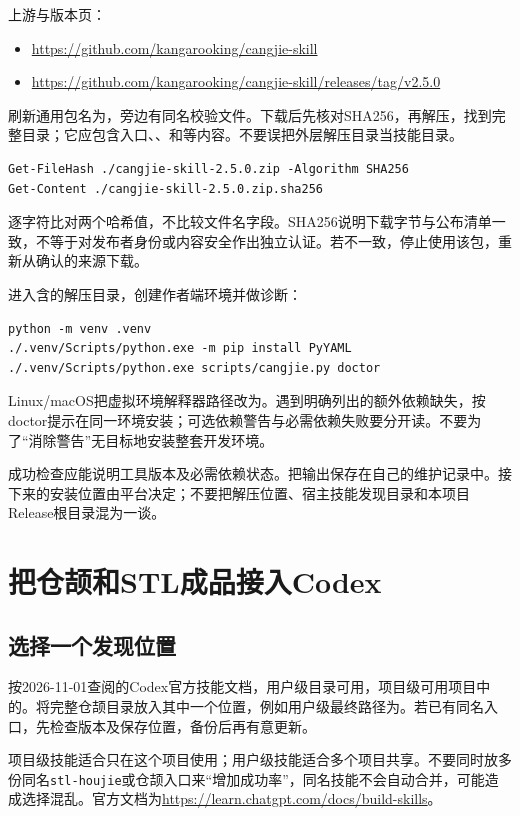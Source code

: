 \documentclass[11pt,a4paper,fontset=fandol]{ctexart}
\begin{document}
\noindent 上游与版本页：
\begin{itemize}
\item \url{https://github.com/kangarooking/cangjie-skill}
\item \url{https://github.com/kangarooking/cangjie-skill/releases/tag/v2.5.0}
\end{itemize}
刷新通用包名为，旁边有同名校验文件。下载后先核对SHA256，再解压，找到完整目录；它应包含入口、、和等内容。不要误把外层解压目录当技能目录。

\begin{lstlisting}
Get-FileHash ./cangjie-skill-2.5.0.zip -Algorithm SHA256
Get-Content ./cangjie-skill-2.5.0.zip.sha256
\end{lstlisting}
逐字符比对两个哈希值，不比较文件名字段。SHA256说明下载字节与公布清单一致，不等于对发布者身份或内容安全作出独立认证。若不一致，停止使用该包，重新从确认的来源下载。

进入含的解压目录，创建作者端环境并做诊断：
\begin{lstlisting}
python -m venv .venv
./.venv/Scripts/python.exe -m pip install PyYAML
./.venv/Scripts/python.exe scripts/cangjie.py doctor
\end{lstlisting}
Linux/macOS把虚拟环境解释器路径改为。遇到明确列出的额外依赖缺失，按doctor提示在同一环境安装；可选依赖警告与必需依赖失败要分开读。不要为了“消除警告”无目标地安装整套开发环境。

成功检查应能说明工具版本及必需依赖状态。把输出保存在自己的维护记录中。接下来的安装位置由平台决定；不要把解压位置、宿主技能发现目录和本项目Release根目录混为一谈。
\section{把仓颉和STL成品接入Codex}
\subsection{选择一个发现位置}
按2026-11-01查阅的Codex官方技能文档，用户级目录可用，项目级可用项目中的。将完整仓颉目录放入其中一个位置，例如用户级最终路径为。若已有同名入口，先检查版本及保存位置，备份后再有意更新。

项目级技能适合只在这个项目使用；用户级技能适合多个项目共享。不要同时放多份同名\texttt{stl-houjie}或仓颉入口来“增加成功率”，同名技能不会自动合并，可能造成选择混乱。官方文档为\url{https://learn.chatgpt.com/docs/build-skills}。
\end{document}
